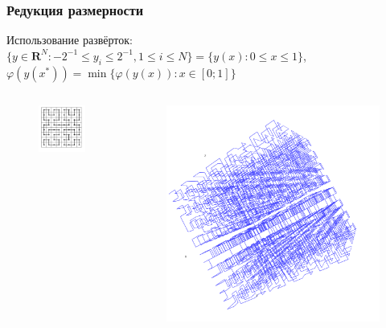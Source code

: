 \documentclass[aspectratio=169]{beamer}
\begin{document}
\begin{frame}
  \frametitle{Редукция размерности}
     Использование развёрток:
    \(\lbrace y\in \mathbf{R}^N:-2^{-1}\leqslant y_i\leqslant 2^{-1},1\leqslant i\leqslant N\rbrace=\{y(x):0\leqslant x\leqslant 1\}\),
    \(\varphi(y(x^*))=\min\{\varphi(y(x)):x\in [0;1]\}\)

  \begin{columns}
    \begin{column}{0.5\textwidth}
      \begin{figure}[ht]
        \centerline{\includegraphics[width=.5\textwidth]{peano2d.png}}
      \end{figure}
    \end{column}
    \begin{column}{0.5\textwidth}
      \begin{figure}[ht]
      \centerline{\includegraphics[width=.6\textwidth]{peano3d.png}}

\end{figure}
\end{column}
\end{columns}
\end{frame}
\end{document}

